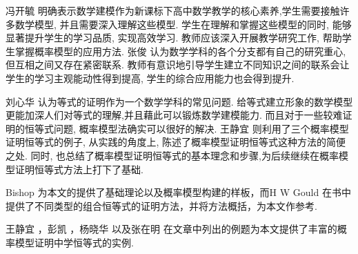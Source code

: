 冯开毓 \parencite{2024_冯开毓_高中数学概率模型的构建与应用} 明确表示数学建模作为新课标下高中数学教学的核心素养,学生需要接触许多数学模型, 并且需要深入理解这些模型. 学生在理解和掌握这些模型的同时, 能够显著提升学生的学习品质, 实现高效学习. 教师应该深入开展教学研究工作, 帮助学生掌握概率模型的应用方法. 张俊 \parencite{2017_张俊_构造概率模型解数学题} 认为数学学科的各个分支都有自己的研究重心,但互相之间又存在紧密联系. 教师有意识地引导学生建立不同知识之间的联系会让学生的学习主观能动性得到提高, 学生的综合应用能力也会得到提升. 

刘心华 \parencite{2002_刘心华_构建概率模型证明等式} 认为等式的证明作为一个数学学科的常见问题. 给等式建立形象的数学模型更能加深人们对等式的理解,并且藉此可以锻炼数学建模能力. 而且对于一些较难证明的恒等式问题, 概率模型法确实可以很好的解决. 王静宜 \parencite{2002_王静宜_建立概率模型证明恒等式} 则利用了三个概率模型证明恒等式的例子, 从实践的角度上, 陈述了概率模型证明恒等式这种方法的简便之处. 同时, 也总结了概率模型证明恒等式的基本理念和步骤,为后续继续在概率模型证明恒等式方法上打下了基础. 

Bishop \parencite{2006_Bishop_C_M_Pattern_recognition_and_machine_learning} 为本文的提供了基础理论以及概率模型构建的样板，而H W Gould \parencite{1972_Gould_Combinatorial_identities__a_standardized_set_of_tables_listing_500_binomial_coefficient_summations} 在书中提供了不同类型的组合恒等式的证明方法，并将方法概括，为本文作参考. 

王静宜 \parencite{2002_王静宜_建立概率模型证明恒等式}，彭凯 \parencite{peng2001}，杨晓华 \parencite{yang2010} 以及张在明 \parencite{zhang1983} 在文章中列出的例题为本文提供了丰富的概率模型证明中学恒等式的实例. 
